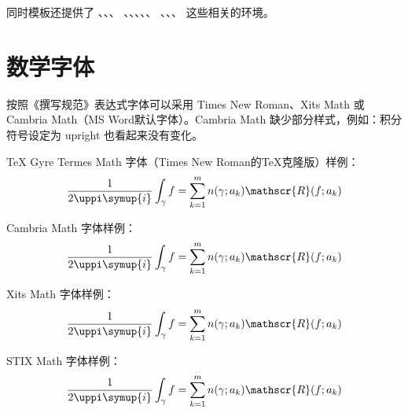 同时模板还提供了 、、、
、、、、、
、、、 这些相关的环境。

\section{数学字体}

按照《撰写规范》表达式字体可以采用 Times New Roman、Xits Math 或 Cambria Math（MS Word默认字体）。Cambria Math 缺少部分样式，例如：积分符号设定为 upright 也看起来没有变化。

TeX Gyre Termes Math 字体（Times New Roman的TeX克隆版）样例：
\makeatletter
\thu@load@math@font@times
\begin{equation}
  \frac{1}{2 \uppi \symup{i}} \int_\gamma f = \sum_{k=1}^m n(\gamma; a_k) \mathscr{R}(f; a_k)
\end{equation}
\makeatother

Cambria Math 字体样例：
\makeatletter
\thu@load@math@font@cambria
\begin{equation}
  \frac{1}{2 \uppi \symup{i}} \int_\gamma f = \sum_{k=1}^m n(\gamma; a_k) \mathscr{R}(f; a_k)
\end{equation}
\makeatother

Xits Math 字体样例：
\makeatletter
\thu@load@math@font@xits
\begin{equation}
  \frac{1}{2 \uppi \symup{i}} \int_\gamma f = \sum_{k=1}^m n(\gamma; a_k) \mathscr{R}(f; a_k)
\end{equation}
\thu@load@math@font@cambria
\makeatother

STIX Math 字体样例：
\makeatletter
\thu@load@math@font@stix
\begin{equation}
  \frac{1}{2 \uppi \symup{i}} \int_\gamma f = \sum_{k=1}^m n(\gamma; a_k) \mathscr{R}(f; a_k)
\end{equation}
\makeatother

